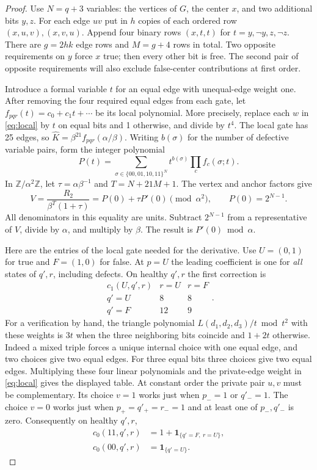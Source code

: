 \begin{proof}
Use \(N=q+3\) variables: the vertices of \(G\), the center \(x\),
and two additional bits \(y,z\). For each edge \(uv\) put in \(h\)
copies of each ordered row \((x,u,v),(x,v,u)\).
Append four binary rows \((x,t,t)\) for \(t=y,\neg y,z,\neg z\).
There are \(g=2hk\) edge rows and \(M=g+4\) rows in total. Two
opposite requirements on \(y\) force \(x\) true; then every other
bit is free. The second pair of opposite requirements will also
exclude false-center contributions at first order.

Introduce a formal variable \(t\) for an equal edge with unequal-edge
weight one. After removing the four required equal edges from each
gate, let \(f_{pqr}(t)=c_0+c_1t+\cdots\) be its local polynomial.
More precisely, replace each \(w\) in \eqref{eq:local} by \(t\)
on equal bits and 1 otherwise, and divide by \(t^4\). The local gate
has 25 edges, so \(\widehat K=\beta^{21} f_{pqr}(\alpha/\beta)\).
Writing \(b(\sigma)\) for the number of defective variable pairs,
form the integer polynomial
\[
 P(t)=\sum_{\sigma\in\{00,01,10,11\}^{N}}
            t^{b(\sigma)}\prod_{c}f_c(\sigma;t).
\]
In \(\mathbb Z/\alpha^2\mathbb Z\), let \(\tau=\alpha\beta^{-1}\)
and \(T=N+21M+1\). The vertex and anchor factors give
\begin{equation}
 V=\frac{R_2}{\beta^T(1+\tau)}
   =P(0)+\tau P'(0)\pmod{\alpha^2},\qquad P(0)=2^{N-1}.       \label{eq:derivative}
\end{equation}
All denominators in this equality are units. Subtract \(2^{N-1}\)
from a representative of \(V\), divide by \(\alpha\), and multiply
by \(\beta\). The result is \(P'(0)\bmod\alpha\).

Here are the entries of the local gate needed for the derivative.
Use \(U=(0,1)\) for true and \(F=(1,0)\) for false. At \(p=U\)
the leading coefficient is one for \emph{all} states of \(q',r\),
including defects. On healthy \(q',r\) the first correction is
\[
 \begin{array}{c|rr}
 c_1(U,q',r)&r=U&r=F\\\hline
 q'=U&8&8\\ q'=F&12&9
 \end{array}.
\]
For a verification by hand, the triangle polynomial
\(L(d_1,d_2,d_3)/t\bmod t^2\) with these weights is \(3t\)
when the three neighboring bits coincide and \(1+2t\) otherwise.
Indeed a mixed triple forces a unique internal choice with one equal
edge, and two choices give two equal edges. For three equal bits
three choices give two equal edges. Multiplying these four linear
polynomials and the private-edge weight in \eqref{eq:local} gives
the displayed table. At constant order the private pair \(u,v\)
must be complementary. Its choice \(v=1\) works just when
\(p_-=1\) or \(q'_-=1\). The choice \(v=0\) works just when
\(p_+=q'_+=r_-=1\) and at least one of \(p_-,q'_-\) is zero.
Consequently on healthy \(q',r\),
\begin{align*}
 c_0(11,q',r)&=1+\mathbf1_{\{q'=F,\ r=U\}},\\
 c_0(00,q',r)&=\mathbf1_{\{q'=U\}} .
\end{align*}


\end{proof}
